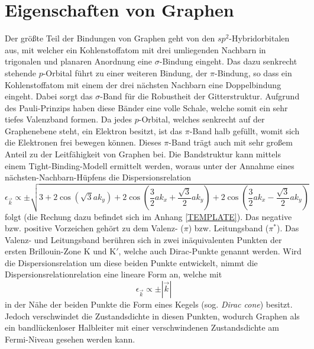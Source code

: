 \section{Eigenschaften von Graphen}
\label{sec:propertiesofgraphene}
Der größte Teil der Bindungen von Graphen geht von den $sp^2$-Hybridorbitalen aus, mit welcher ein Kohlenstoffatom mit drei umliegenden
Nachbarn in trigonalen und planaren Anordnung eine $\sigma$-Bindung eingeht.\cite{RevModPhys.81.109}
Das dazu senkrecht stehende $p$-Orbital führt zu einer weiteren Bindung, der $\pi$-Bindung, so dass ein Kohlenstoffatom
mit einem der drei nächsten Nachbarn eine Doppelbindung eingeht.
Dabei sorgt das $\sigma$-Band für die Robustheit der Gitterstruktur.\cite{RevModPhys.81.109}
Aufgrund des Pauli-Prinzips haben diese Bänder eine volle Schale, welche somit ein sehr tiefes Valenzband
formen.\cite{RevModPhys.81.109}
Da jedes $p$-Orbital, welches senkrecht auf der Graphenebene steht, ein Elektron
besitzt, ist das $\pi$-Band halb gefüllt, womit sich die Elektronen frei bewegen können.\cite{RevModPhys.81.109}\cite{graphene_properties}
Dieses $\pi$-Band trägt auch mit sehr großem Anteil zu der Leitfähigkeit von Graphen bei.\cite{graphene_properties}
Die Bandstruktur kann mittels einem Tight-Binding-Modell ermittelt werden, woraus unter der Annahme eines nächsten-Nachbarn-Hüpfens
die Dispersionsrelation 
\begin{equation*}
    \epsilon_{\vec{k}} \propto \pm \sqrt{3+2\cos(\sqrt{3}ak_y)+2\cos(\frac{3}{2}ak_x+\frac{\sqrt{3}}{2}ak_y) + 2\cos(\frac{3}{2}ak_x-\frac{\sqrt{3}}{2}ak_y) }
\end{equation*}
folgt (die Rechung dazu befindet sich im Anhang \ref{TEMPLATE}).
Das negative bzw. positive Vorzeichen gehört zu dem Valenz- ($\pi$) bzw. Leitungsband ($\pi^*$).\cite{RevModPhys.81.109}
Das Valenz- und Leitungsband berühren sich in zwei inäquivalenten Punkten der ersten Brillouin-Zone K und $\text{K}'$, welche 
auch Dirac-Punkte genannt werden.\cite{10.1093/nsr/nwu080}
Wird die Dispersionsrelation um diese beiden Punkte entwickelt, nimmt die Dispersionsrelationrelation eine lineare Form an, welche mit 
\begin{equation}
    \epsilon_{\vec{k}} \propto \pm | \vec{k} | 
\end{equation}
in der Nähe der beiden Punkte die Form eines Kegels (sog. \textit{Dirac cone}) besitzt.\cite{10.1093/nsr/nwu080}\cite{Avouris2007}
Jedoch verschwindet die Zustandsdichte in diesen Punkten, wodurch Graphen als ein bandlückenloser Halbleiter mit einer verschwindenen 
Zustandsdichte am Fermi-Niveau gesehen werden kann.\cite{10.1093/nsr/nwu080}
